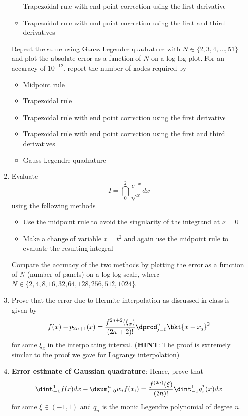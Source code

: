\documentclass{article}
\begin{document}
\begin{enumerate}
\begin{itemize}
			Trapezoidal rule with end point correction using the first derivative
			\item
			Trapezoidal rule with end point correction using the first and third derivatives
		\end{itemize}
		Repeat the same using Gauss Legendre quadrature with $N \in \{2,3,4,\ldots,51\}$ and plot the absolute error as a function of $N$ on a log-log plot. For an accuracy of $10^{-12}$, report the number of nodes required by
		\begin{itemize}
			\item
			Midpoint rule
			\item
			Trapezoidal rule
			\item
			Trapezoidal rule with end point correction using the first derivative
			\item
			Trapezoidal rule with end point correction using the first and third derivatives
			\item
			Gauss Legendre quadrature
		\end{itemize}
		\item
		Evaluate
		$$I = \dint_0^2 \dfrac{e^{-x}}{\sqrt{x}}dx$$
		using the following methods
		\begin{itemize}
			\item
			Use the midpoint rule to avoid the singularity of the integrand at $x=0$
			\item
			Make a change of variable $x=t^2$ and again use the midpoint rule to evaluate the resulting integral
		\end{itemize}
		Compare the accuracy of the two methods by plotting the error as a function of $N$ (number of panels) on a log-log scale, where $N \in \{2,4,8,16,32,64,128,256,512,1024\}$.
		\item
		Prove that the error due to Hermite interpolation as discussed in class is given by
		$$f(x) - p_{2n+1}(x) = \dfrac{f^{2n+2}(\xi_x)}{(2n+2)!} \dprod_{j=0}^n \bkt{x-x_j}^2$$
		for some $\xi_x$ in the interpolating interval. (\textbf{HINT}: The proof is extremely similar to the proof we gave for Lagrange interpolation)
		\item
		\textbf{Error estimate of Gaussian quadrature}: Hence, prove that
		$$\dint_{-1}^1 f(x) dx - \dsum_{i=0}^{n}w_i f(x_i) = \dfrac{f^{(2n)}(\xi)}{(2n)!} \dint_{-1}^1 q_n^2(x)dx$$
		for some $\xi \in (-1,1)$ and $q_n$ is the monic Legendre polynomial of degree $n$.
	\end{enumerate}
\end{document}

